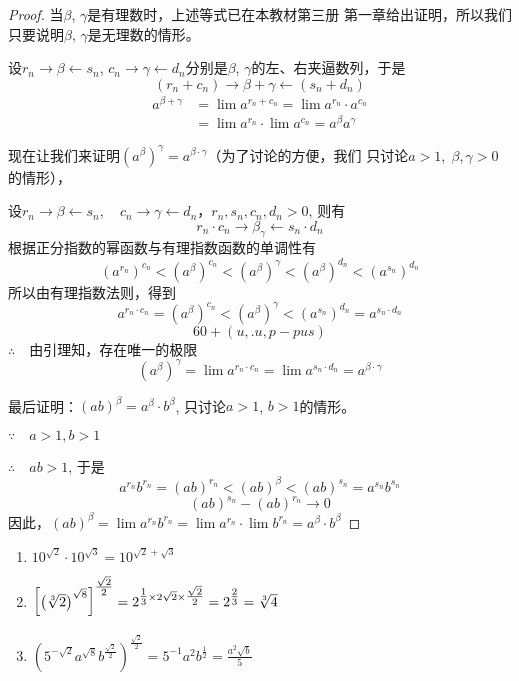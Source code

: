 \begin{proof}
当$\beta$, $\gamma$是有理数时，上述等式已在本教材第三册
第一章给出证明，所以我们只要说明$\beta$, $\gamma$是无理数的情形。

设$r_n\to\beta\leftarrow s_n$, $c_n\to\gamma\leftarrow d_n$分别是$\beta$, $\gamma$的左、右夹逼数列，于是
\[(r_n+c_n)\to \beta+\gamma \leftarrow (s_n+d_n)\]
\[\begin{split}
  a^{\beta+\gamma}&=\lim a^{r_n+c_n}=\lim a^{r_n}\cdot a^{c_n}\\
  &=\lim a^{r_n}\cdot \lim a^{c_n}=a^{\beta}a^{\gamma}
\end{split}\]

现在让我们来证明$(a^{\beta})^{\gamma}=a^{\beta\cdot \gamma}$（为了讨论的方便，我们
只讨论$a>1,\; \beta ,\gamma>0$的情形），

设$r_n\to \beta \leftarrow s_n,\quad c_n\to \gamma\leftarrow d_n$，$r_n, s_n,c_n,d_n>0$, 则有
\[r_n\cdot c_n\to \beta_{\gamma}\leftarrow s_n\cdot d_n\]
根据正分指数的幂函数与有理指数函数的单调性有
\[(a^{r_n})^{c_n}<(a^{\beta})^{c_n}<(a^{\beta})^{\gamma}<(a^{\beta})^{d_n}<(a^{s_n})^{d_n}\]
所以由有理指数法则，得到
\[a^{r_n\cdot c_n}=(a^{\beta})^{c_n}<(a^{\beta})^{\gamma}<(a^{s_n})^{d_n}=a^{s_n\cdot d_n}\]
\[60+(u,.u,p-pus)\]
$\therefore\quad $由引理知，存在唯一的极限
\[(a^{\beta})^{\gamma}=\lim a^{r_n\cdot c_n} =\lim a^{s_n\cdot d_n} =a^{\beta\cdot \gamma}\]

最后证明：$(ab)^{\beta}=a^{\beta}\cdot b^{\beta}$, 只讨论$a>1$, $b>1$的情形。

$\because\quad a>1,b>1$

$\therefore\quad ab>1$, 于是
\[a^{r_n}b^{r_n}=(ab)^{r_n}<(ab)^{\beta}<(ab)^{s_n}=a^{s_n}b^{s_n}\]
\[(ab)^{s_n}-(ab)^{r_n}\to 0\]
因此，$(ab)^{\beta}=\lim a^{r_n}b^{r_n} = \lim a^{r_n}\cdot \lim b^{r_n}=a^{\beta}\cdot b^{\beta}$
\end{proof}

\begin{example}
  \begin{enumerate}
    \item $10^{\sqrt{2}}\cdot 10^{\sqrt{3}}=10^{\sqrt{2}+\sqrt{3}}$
    \item  $\left[\left(\sqrt[3]{2}\right)^{\sqrt{8}}\right]^{\tfrac{\sqrt{2}}{2}}=2^{\tfrac{1}{3}\times 2\sqrt{2}\times\tfrac{\sqrt{2}}{2}}=2^{\tfrac{2}{3}}=\sqrt[3]{4}$
    \item $\left(5^{-\sqrt{2}}a^{\sqrt{8}}b^{\tfrac{\sqrt{2}}{2}}\right)^{\tfrac{\sqrt{2}}{2}}=5^{-1}a^{2}b^{\tfrac{1}{2}} =\frac{a^2\sqrt{b}}{5} $
  \end{enumerate}
\end{example}

